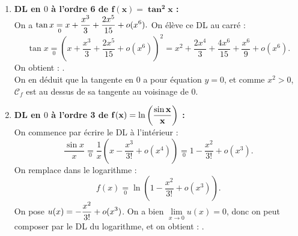 \documentclass[a4paper, 11pt,reqno]{article}
\begin{document}
\begin{correction}
\begin{enumerate}
		      Attention, cette expression ne tend pas vers $0$, on ne peut pas composer directement. On remplace dans l'exponentielle :
		      $$f(x) \underset{0}{=} \exp\left(1 + \frac{x}{2}- \frac{x^2}{8} + \frac{x^3}{16} + o(x^3) \right) \underset{0}{=}  e \times \exp\left(\frac{x}{2}- \frac{x^2}{8} + \frac{x^3}{16} + o(x^3) \right) .$$
		      On peut cette fois composer, et on obtient :
		      $$f(x) \underset{0}{=} e \left(1+\frac{x}{2}- \frac{x^2}{8} + \frac{x^3}{16}+ \frac{1}{2} \left(\frac{x}{2}- \frac{x^2}{8} + \frac{x^3}{16}\right)^2 + \frac{1}{3!}\left(\frac{x}{2}- \frac{x^2}{8} + \frac{x^3}{16}\right)^3 + o(x^3) \right).$$
		      On en d\'eduit : .\\
		      On en d\'eduit que la tangente en $0$ a pour \'equation $y=e+\ddp \frac{e}{2} x$. De plus, on a  $\ddp\frac{x^3}{48} < 0$ si $x<0$, donc $\mathcal{C}_f$ est en dessous de sa tangente au voisinage de $0$ \`a gauche, et $\ddp\frac{x^3}{48}>0$ si $x>0$, donc $\mathcal{C}_f$ est au dessus de sa tangente au voisinage de $0$ \`a droite.%
		\item \textbf{DL en $0$ \`a l'ordre 6 de $\mathbf{f(x)=\tan^2{x}}$ :}\\
		      On a $\displaystyle \tan x \underset{0}{=} x + \frac{x^3}{3} + \frac{2x^5}{15} + o(x^6).$
		      On \'el\`eve ce DL au carr\'e :
		      $$\tan x  \underset{0}{=} \left(x + \frac{x^3}{3} + \frac{2x^5}{15} + o(x^6)\right)^2 = x^2 + \frac{2 x^4}{3} + \frac{4x^6}{15} + \frac{x^6}{9} + o(x^6).$$
		      On obtient : .\\
		      On en d\'eduit que la tangente en $0$ a pour \'equation $y=0$, et comme $x^2>0$, $\mathcal{C}_f$ est au dessus de sa tangente au voisinage de $0$.
		\item \textbf{DL en $0$ \`a l'ordre 3 de $\mathbf{f(x)=\ln{\left( \displaystyle\frac{\sin{x}}{x} \right)}}$ :}\\
		      On commence par \'ecrire le DL \`a l'int\'erieur :
		      $$\frac{\sin x}{x} \underset{0}{=} \frac{1}{x}\left(x- \frac{x^3}{3!} + o(x^4) \right) \underset{0}{=} 1 - \frac{x^2}{3!} + o(x^3).$$
		      On remplace dans le logarithme :
		      $$f(x) \underset{0}{=} \ln \left( 1 - \frac{x^2}{3!} + o(x^3)\right).$$
		      On pose $\displaystyle u(x) = - \frac{x^2}{3!} + o(x^3)$. On a bien $\lim\limits_{x\to 0 } u(x) = 0$, donc on peut composer par le DL du logarithme, et on obtient : .\\

\end{enumerate}
\end{correction}
\end{document}

